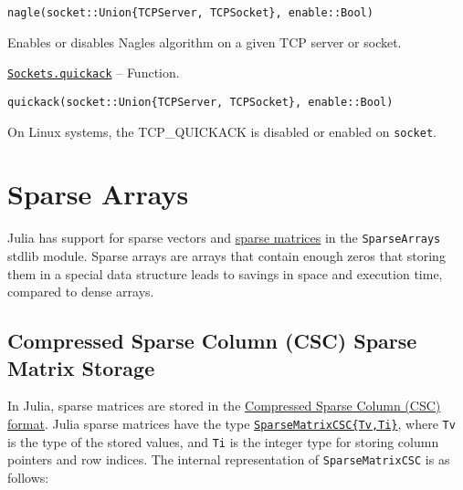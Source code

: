 \begin{adjustwidth}{2em}{0pt}


\begin{verbatim}
nagle(socket::Union{TCPServer, TCPSocket}, enable::Bool)
\end{verbatim}

Enables or disables Nagle{\textquotesingle}s algorithm on a given TCP server or socket.



\end{adjustwidth}
\hypertarget{14774922472341203206}{} 
\hyperlink{14774922472341203206}{\texttt{Sockets.quickack}}  -- {Function.}

\begin{adjustwidth}{2em}{0pt}


\begin{verbatim}
quickack(socket::Union{TCPServer, TCPSocket}, enable::Bool)
\end{verbatim}

On Linux systems, the TCP\_QUICKACK is disabled or enabled on \texttt{socket}.



\end{adjustwidth}

\hypertarget{1891883453893320550}{}


\chapter{Sparse Arrays}





Julia has support for sparse vectors and \href{https://en.wikipedia.org/wiki/Sparse\_matrix}{sparse matrices} in the \texttt{SparseArrays} stdlib module. Sparse arrays are arrays that contain enough zeros that storing them in a special data structure leads to savings in space and execution time, compared to dense arrays.



\hypertarget{4438718230137239554}{}


\section{Compressed Sparse Column (CSC) Sparse Matrix Storage}



In Julia, sparse matrices are stored in the \href{https://en.wikipedia.org/wiki/Sparse\_matrix\#Compressed\_sparse\_column\_.28CSC\_or\_CCS.29}{Compressed Sparse Column (CSC) format}. Julia sparse matrices have the type \hyperlink{15099699527958384292}{\texttt{SparseMatrixCSC\{Tv,Ti\}}}, where \texttt{Tv} is the type of the stored values, and \texttt{Ti} is the integer type for storing column pointers and row indices. The internal representation of \texttt{SparseMatrixCSC} is as follows:




